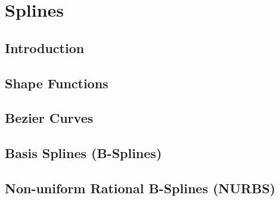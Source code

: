 


	
\chapter{Splines}
\label{ch:splines}


\section{Introduction}
\label{sec:splinesintro}

\section{Shape Functions}

\section{Bezier Curves}

\section{Basis Splines (B-Splines)}

\section{Non-uniform Rational B-Splines (NURBS)}




  
 {}

 

